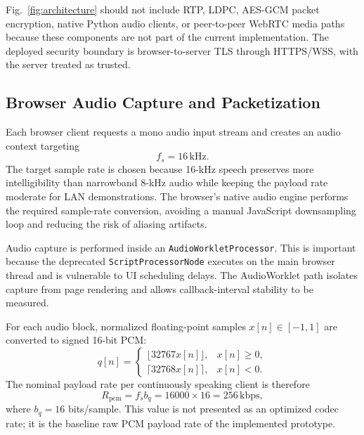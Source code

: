 \documentclass[conference]{IEEEtran}
\begin{document}
Fig.~\ref{fig:architecture} should not include RTP, LDPC, AES-GCM packet encryption, native Python audio clients, or peer-to-peer WebRTC media paths because these components are not part of the current implementation. The deployed security boundary is browser-to-server TLS through HTTPS/WSS, with the server treated as trusted.

\subsection{Browser Audio Capture and Packetization}

Each browser client requests a mono audio input stream and creates an audio context targeting
\begin{equation}
    f_s = 16\,\mathrm{kHz}.
    \label{eq:sample_rate}
\end{equation}
The target sample rate is chosen because 16-kHz speech preserves more intelligibility than narrowband 8-kHz audio while keeping the payload rate moderate for LAN demonstrations. The browser's native audio engine performs the required sample-rate conversion, avoiding a manual JavaScript downsampling loop and reducing the risk of aliasing artifacts.

Audio capture is performed inside an \texttt{AudioWorkletProcessor}. This is important because the deprecated \texttt{ScriptProcessorNode} executes on the main browser thread and is vulnerable to UI scheduling delays. The AudioWorklet path isolates capture from page rendering and allows callback-interval stability to be measured.

For each audio block, normalized floating-point samples $x[n]\in[-1,1]$ are converted to signed 16-bit PCM:
\begin{equation}
    q[n]=
    \begin{cases}
        \lfloor 32767x[n]\rfloor, & x[n]\geq 0,\\
        \lceil 32768x[n]\rceil, & x[n]<0.
    \end{cases}
    \label{eq:pcm_quant}
\end{equation}
The nominal payload rate per continuously speaking client is therefore
\begin{equation}
    R_{\mathrm{pcm}} = f_s b_q = 16000 \times 16 = 256\,\mathrm{kbps},
    \label{eq:pcm_rate}
\end{equation}
where $b_q=16$ bits/sample. This value is not presented as an optimized codec rate; it is the baseline raw PCM payload rate of the implemented prototype.
\end{document}
